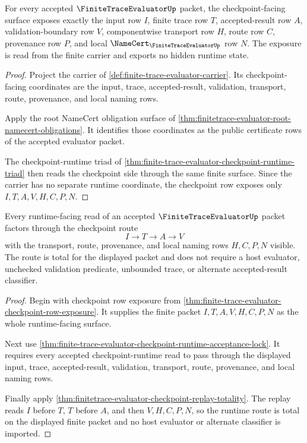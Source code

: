 \begin{theorem}
\label{thm:finite-trace-evaluator-checkpoint-row-exposure}
For every accepted $\FiniteTraceEvaluatorUp$ packet, the checkpoint-facing surface exposes exactly the input row $I$, finite trace row $T$, accepted-result row $A$, validation-boundary row $V$, componentwise transport row $H$, route row $C$, provenance row $P$, and local $\NameCert_{\FiniteTraceEvaluatorUp}$ row $N$. The exposure is read from the finite carrier and exports no hidden runtime state.
\end{theorem}
\begin{proof}
Project the carrier of \autoref{def:finite-trace-evaluator-carrier}. Its checkpoint-facing coordinates are the input, trace, accepted-result, validation, transport, route, provenance, and local naming rows.

Apply the root NameCert obligation surface of \autoref{thm:finitetrace-evaluator-root-namecert-obligations}. It identifies those coordinates as the public certificate rows of the accepted evaluator packet.

The checkpoint-runtime triad of \autoref{thm:finite-trace-evaluator-checkpoint-runtime-triad} then reads the checkpoint side through the same finite surface. Since the carrier has no separate runtime coordinate, the checkpoint row exposes only $I,T,A,V,H,C,P,N$.
\end{proof}

\begin{theorem}
\label{thm:finite-trace-evaluator-runtime-route-totality}
Every runtime-facing read of an accepted $\FiniteTraceEvaluatorUp$ packet factors through the checkpoint route
$$
I \to T \to A \to V
$$
with the transport, route, provenance, and local naming rows $H,C,P,N$ visible. The route is total for the displayed packet and does not require a host evaluator, unchecked validation predicate, unbounded trace, or alternate accepted-result classifier.
\end{theorem}
\begin{proof}
Begin with checkpoint row exposure from \autoref{thm:finite-trace-evaluator-checkpoint-row-exposure}. It supplies the finite packet $I,T,A,V,H,C,P,N$ as the whole runtime-facing surface.

Next use \autoref{thm:finite-trace-evaluator-checkpoint-runtime-acceptance-lock}. It requires every accepted checkpoint-runtime read to pass through the displayed input, trace, accepted-result, validation, transport, route, provenance, and local naming rows.

Finally apply \autoref{thm:finitetrace-evaluator-checkpoint-replay-totality}. The replay reads $I$ before $T$, $T$ before $A$, and then $V,H,C,P,N$, so the runtime route is total on the displayed finite packet and no host evaluator or alternate classifier is imported.
\end{proof}

